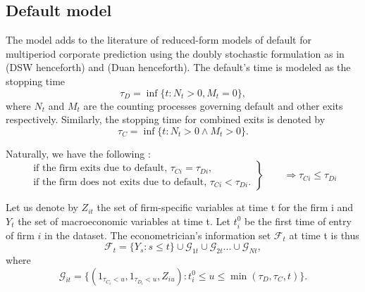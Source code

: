 \subsection{Default model}
\label{SS:2-1}

The model adds to the literature of reduced-form models of default for multiperiod corporate prediction using the doubly stochastic formulation as in \citet{DSW} (DSW henceforth) and \citet{Duan2012} (Duan henceforth). The default's time is modeled as the stopping time 
\begin{equation}
\tau_D = \inf\{t : N_t >0 , M_t = 0\},
\end{equation}
where $N_t$ and $M_t$ are the counting processes governing default and other exits respectively. Similarly, the stopping time for combined exits is denoted by
\begin{equation}
\tau_C = \inf\{t : N_t >0 \wedge M_t > 0\}.
\end{equation}

\noindent Naturally, we have the following :
\begin{equation*}
 \left.\begin{aligned}
        \text{if the firm exits due to default, } \tau_{Ci} = \tau_{Di},\\
        \text{if the firm does not exits due to default, } \tau_{Ci} < \tau_{Di}.
       \end{aligned}
 \right\}
 \qquad \text{$\Rightarrow \tau_{Ci} \leq \tau_{Di}$}
\end{equation*}

Let us denote by $Z_{it}$ the set of firm-specific variables at time t for the firm i and $Y_t$ the set of macroeconomic variables at time t. Let  $t_i^0$ be the first time of entry of firm $i$ in the dataset. The econometrician's information set $\mathscr{F}_t$ at time t is thus
\begin{equation}
    \mathscr{F}_t = \{ Y_s : s \leq t \} \cup \mathscr{G}_{1t}  \cup \mathscr{G}_{2t} ... \cup \mathscr{G}_{Nt},
\end{equation}
where 
\begin{equation}
    \mathscr{G}_{it}  = \{  (1_{\tau_{C_i} < u} , 1_{\tau_{D_i} < u} , Z_{iu}) : t_i^0 \leq u \leq \min(\tau_D, \tau_C, t)  \}.
\end{equation}

